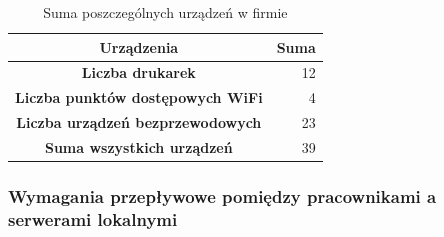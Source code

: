 \documentclass[a4paper,12pt]{extarticle}  %
\begin{document}
\begin{table}[H]
	\centering
	\caption{Suma poszczególnych urządzeń w firmie}
	\vspace{2mm}
	\begin{tabular}{|c|r|}\hline
		\textbf{Urządzenia}                      & \multicolumn{1}{l|}{\textbf{Suma}} \bigstrut \\\hline
		\textbf{Liczba drukarek}                 & 12 \bigstrut                                 \\\hline
		\textbf{Liczba punktów dostępowych WiFi} & 4 \bigstrut                                  \\\hline
		\textbf{Liczba urządzeń bezprzewodowych} & 23 \bigstrut                                 \\\hline
		\textbf{Suma wszystkich urządzeń}        & 39 \bigstrut                                 \\\hline
	\end{tabular}%
	\label{tab:devices_sum}%
\end{table}%

\subsubsection{Wymagania przepływowe pomiędzy pracownikami a serwerami lokalnymi}
\end{document}
